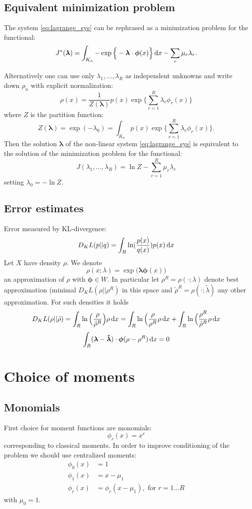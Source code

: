 \documentclass{article}
\def\d{\,{\rm d}}               %
\def\vc#1{\mathbf{\boldsymbol{#1}}}     %
\begin{document}
 



\subsection{Equivalent minimization problem}
The system \eqref{eq:lagrange_sys} can be rephrased as a minimization problem
for the functional:
\[
    J^*(\vc\lambda) = \int_{K_n} -\exp\Big\{ - \vc\lambda\cdot \vc\phi(x)\Big\} \d x  - \sum_r \mu_r \lambda_r.
\]

Alternatively one can use only $\lambda_1,\dots,\lambda_R$ as independent unknowns
and write down $\rho_n$ with explicit normalization:
\[
 \rho(x) = \frac{1}{Z(\vc \lambda)} p(x) \exp\Big\{ \sum_{r=1}^R \lambda_r \phi_r(x)\Big\}
\]
where $Z$ is the partition function:
\[
Z(\vc \lambda) = \exp(-\lambda_0) = \int_{K_n} p(x) \exp\Big\{ \sum_{r=1}^R \lambda_r \phi_r(x)\Big\}.
\]
Then the solution $\vc\lambda$ of the non-linear system \eqref{eq:lagrange_sys} is equivalent to the solution of the minimization problem for the functional:
\[
    J(\lambda_1, \dots, \lambda_R) = \ln Z - \sum_{r=1}^R \mu_r \lambda_r
\]
setting $\lambda_0 = -\ln Z$.

\subsection{Error estimates}
Error measured by KL-divergence:
\[
    D_KL(p||q) = \int_R \ln(\frac{p(x)}{q(x)}) p(x) \d x 
\]
Let $X$ have density $\rho$. We denote 
\[
    \rho(x; \lambda) = \exp\Big(\vc \lambda \vc \phi(x)\Big)
\]
an approximation of $\rho$ with $\vc \phi \in W$. In particular
let $\rho^R=\rho(\cdot;\lambda)$ denote best approximation (minimal $D_KL(\rho||\rho^R)$
in this space and $\tilde\rho^R=\rho(\cdot;\tilde\lambda)$ any other approximation. For such densities it holds  
\[
    D_KL(\rho||\tilde\rho) 
    = \int_R \ln\Big(\frac{\rho}{\tilde\rho^R}\Big) \rho \d x
    = \int_R \ln\Big(\frac{\rho}{\rho^R} \rho \d x 
    + \int_R \ln\Big(\frac{\rho^R}{\tilde\rho^R} \rho \d x
\]
\[
\int_R (\vc\lambda - \vc{\tilde\lambda}) \cdot \vc \phi (\rho - \rho^R) \d x
 = 0
 \]

\section{Choice of moments}
\subsection{Monomials}
First choice for moment functions are monomials:
\[
    \phi_r(x) = x^r
\]
corresponding to classical moments.
In order to improve conditioning of the problem we should use centralized moments:
\begin{align}
    \phi_0(x) &= 1\\
    \phi_1(x) &= x - \mu_1\\
    \phi_r(x) &= \phi_r(x - \mu_1), \text{ for }r=1\dots R
\end{align}
with $\mu_0 = 1$.
\end{document}
